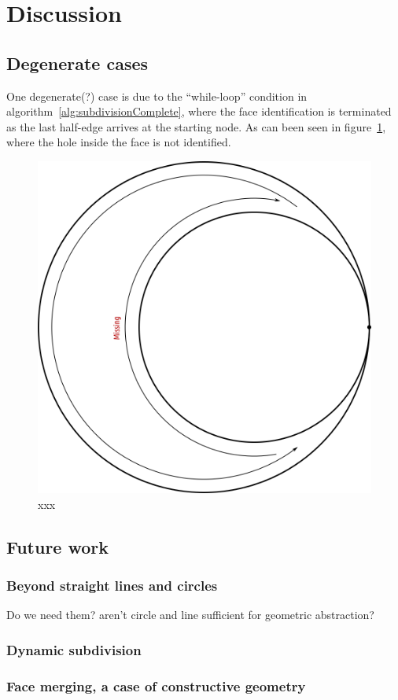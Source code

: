 \section{Discussion} \label{sec:discussion}

\subsection{Degenerate cases}


One degenerate(?) case is due to the ``while-loop'' condition in algorithm~\ref{alg:subdivisionComplete}, where the face identification is terminated as the last half-edge arrives at the starting node.
As can been seen in figure~\ref{fig:disc_specialCase1}, where the hole inside the face is not identified.

\begin{figure} %
    \centering
    \includegraphics[width=.3\textwidth]{figures/disc_specialCase1.png}
    \caption{xxx}
    \label{fig:disc_specialCase1}
\end{figure}


\subsection{Future work}


\subsubsection{Beyond straight lines and circles}

Do we need them? aren't circle and line sufficient for geometric abstraction?

\subsubsection{Dynamic subdivision}


\subsubsection{Face merging, a case of constructive geometry}

